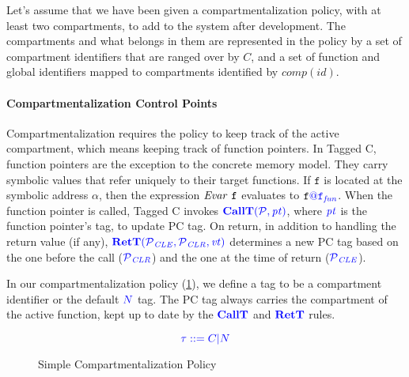 \documentclass{llncs}
\begin{document}
Let's assume that we have been given a compartmentalization policy, with at least two compartments, to add to the system
after development. The compartments and what belongs in them are represented in the policy by a set of compartment identifiers that 
are ranged over by \(C\), and a set of function and global identifiers mapped to compartments identified by \(\mathit{comp}(id)\).

\paragraph*{Compartmentalization Control Points}

Compartmentalization requires the policy to keep track of the active compartment, which means
keeping track of function pointers. In Tagged C, function pointers are the exception to the
concrete memory model. They carry symbolic values that refer uniquely to their target functions.
If \(\mathtt{f}\) is located at the symbolic address \(\alpha\), then
the expression \(\var{\mathtt{f}}\) evaluates to \(\mathtt{f}\tagat\FN[f]\).
When the function pointer is called, Tagged C invokes \(\callt\), where \(\pt\) is the
function pointer's tag, to update PC tag.
On return, in addition to handling the return value (if any), \(\rett\) determines a new PC tag
based on the one before the call (\(\PCT[_{CLR}]\)) and the one at the time of return (\(\PCT[_{CLE}]\)).

In our compartmentalization policy (\cref{fig:compartments}), we define a tag to be a compartment
identifier or the default \(\N\) tag. The PC tag always carries the compartment of the
active function, kept up to date by the \(\calltname\) and \(\rettname\) rules.

\begin{figure}
  \scriptsize
  \color{blue}
  \begin{minipage}[t]{0.4\textwidth}
    \vspace{-3em}
    \[\color{blue} \tau ::= C | \N\]

  
  \end{minipage}
  \begin{minipage}[t]{0.25\textwidth}
  \end{minipage}
  \begin{minipage}[t]{0.25\textwidth}
    
  \end{minipage}
    
  \caption{Simple Compartmentalization Policy}
  \label{fig:compartments}
\end{figure}
\end{document}
